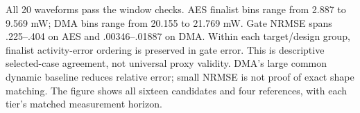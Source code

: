 All 20 waveforms pass the window checks. AES finalist bins range from 2.887 to 9.569 mW; DMA bins range from 20.155 to 21.769 mW. Gate NRMSE spans .225--.404 on AES and .00346--.01887 on DMA. Within each target/design group, finalist activity-error ordering is preserved in gate error. This is descriptive selected-case agreement, not universal proxy validity. DMA's large common dynamic baseline reduces relative error; small NRMSE is not proof of exact shape matching. The figure shows all sixteen candidates and four references, with each tier's matched measurement horizon.
